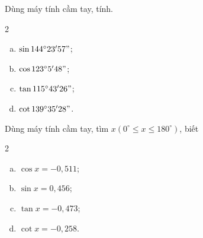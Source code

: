 \begin{bt}%
	Dùng máy tính cầm tay, tính.
	\begin{multicols}{2}
		\begin{enumerate}[a)]
			\item $\sin 144^\circ 23'57"$;
			\item $\cos 123^\circ 5'48"$;
			\item $\tan 115^\circ 43'26"$;
			\item $\cot 139^\circ 35'28"$.
		\end{enumerate}
	\end{multicols}
\end{bt}

\begin{bt}%
	Dùng máy tính cầm tay, tìm $x\left(0^\circ \leq x \leq 180^\circ\right)$, biết
	\begin{multicols}{2}
		\begin{enumerate}[a)]
			\item $\cos x=-0{,}511$;
			\item $\sin x=0{,}456$;
			\item $\tan x=-0{,}473$;
			\item $\cot x=-0{,}258$.
		\end{enumerate}
	\end{multicols}
\end{bt}

